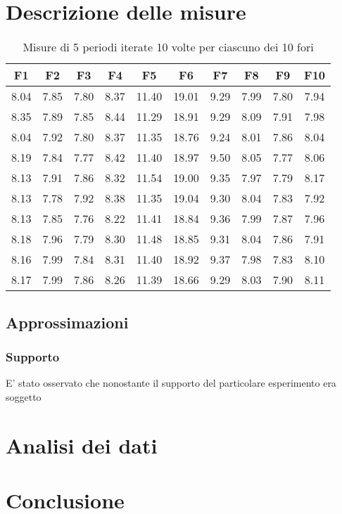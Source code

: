 \documentclass[11pt]{article}
\begin{document}
\section{Descrizione delle misure}

\begin{table}
    \centering
    \caption{Misure di 5 periodi iterate 10 volte per ciascuno dei 10 fori }
 
    \begin{tabular}{|c|c|c|c|c|c|c|c|c|c|}
        \hline
        \textbf{F1} & \textbf{F2} & \textbf{F3} & \textbf{F4} & \textbf{F5} & \textbf{F6} & \textbf{F7} & \textbf{F8} & \textbf{F9} & \textbf{F10} \\
        \hline
 
  8.04 & 7.85 & 7.80 & 8.37 & 11.40 & 19.01 & 9.29 & 7.99 & 7.80 & 7.94 \\
  8.35 & 7.89 & 7.85 & 8.44 & 11.29 & 18.91 & 9.29 & 8.09 & 7.91 & 7.98 \\
  8.04 & 7.92 & 7.80 & 8.37 & 11.35 & 18.76 & 9.24 & 8.01 & 7.86 & 8.04 \\
  8.19 & 7.84 & 7.77 & 8.42 & 11.40 & 18.97 & 9.50 & 8.05 & 7.77 & 8.06 \\
  8.13 & 7.91 & 7.86 & 8.32 & 11.54 & 19.00 & 9.35 & 7.97 & 7.79 & 8.17 \\
  8.13 & 7.78 & 7.92 & 8.38 & 11.35 & 19.04 & 9.30 & 8.04 & 7.83 & 7.92 \\
  8.13 & 7.85 & 7.76 & 8.22 & 11.41 & 18.84 & 9.36 & 7.99 & 7.87 & 7.96 \\
  8.18 & 7.96 & 7.79 & 8.30 & 11.48 & 18.85 & 9.31 & 8.04 & 7.86 & 7.91 \\
  8.16 & 7.99 & 7.84 & 8.31 & 11.40 & 18.92 & 9.37 & 7.98 & 7.83 & 8.10 \\
  8.17 & 7.99 & 7.86 & 8.26 & 11.39 & 18.66 & 9.29 & 8.03 & 7.90 & 8.11 \\
 \hline
    \end{tabular}
\end{table}


\subsection{Approssimazioni}
\subsubsection{Supporto}
E' stato osservato che nonostante il supporto del particolare esperimento era soggetto
\section{Analisi dei dati}

\section{Conclusione}
\end{document}
